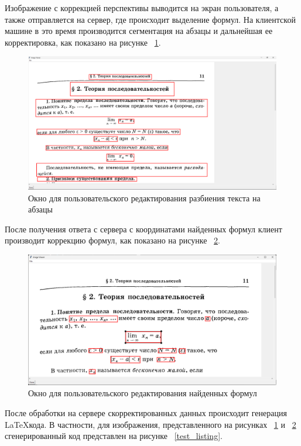 Изображение с коррекцией перспективы выводится на экран пользователя, а также отправляется на сервер, где происходит выделение формул. На клиентской машине в это время производится сегментация на абзацы и дальнейшая ее корректировка, как показано на рисунке ~\ref{paragraph_segmentation_window}.

\begin{figure}
    \includegraphics[scale=0.25]{img/app/paragraph_segmentation.png}
    \caption{Окно для пользовательского редактирования разбиения текста на абзацы}
    \label{paragraph_segmentation_window}
\end{figure}

После получения ответа с сервера с координатами найденных формул клиент производит коррекцию формул, как показано на рисунке ~\ref{formula_editor_window}.

\begin{figure}
    \includegraphics[scale=0.25]{img/app/formula_editor_window.png}
    \caption{Окно для пользовательского редактирования найденных формул}
    \label{formula_editor_window}
\end{figure}

После обработки на сервере скорректированных данных происходит генерация \LaTeX\-кода. В частности, для изображения, представленного на рисунках ~\ref{paragraph_segmentation_window} и ~\ref{formula_editor_window} сгенерированный код представлен на рисунке ~\ref{test_listing}.

